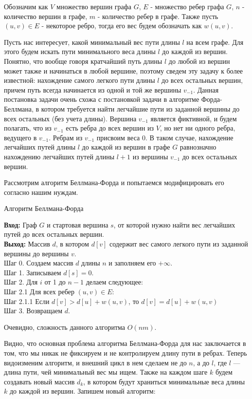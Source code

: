 \documentclass[a4paper,12pt]{report}
\theoremstyle{plain} %
\theoremstyle{definition}
\theoremstyle{remark}
\begin{document}
\begin{large}
Обозначим как $V$ множество вершин графа $G$, $E$ - множество ребер графа $G$, $n$ - количество вершин в графе, $m$ - количество ребер в графе. Также пусть $(u, v) \in E$ - некоторое ребро, тогда его вес будем обозначать как $w(u, v)$.

Пусть нас интересует, какой минимальный вес пути длины $l$ на всем графе. Для этого будем искать пути минимального веса длины $l$ до каждой из вершин. Понятно, что вообще говоря кратчайший путь длины $l$ до любой из вершин может также и начинаться в любой вершине, поэтому сведем эту задачу к более известной: нахождение самого легкого пути длины $l$ до всех остальных вершин, причем путь всегда начинается из одной и той же вершины $v_{-1}$. Данная постановка задачи очень схожа с постановкой задачи в алгоритме Форда-Беллмана, в котором требуется найти легчайшие пути из заданной вершины до всех остальных (без учета длины). Вершина $v_{-1}$ является фиктивной, и будем полагать, что из $v_{-1}$ есть ребра до всех вершин из $V$, но нет ни одного ребра, ведущего в $v_{-1}$. Ребрам из $v_{-1}$ присвоим веса 0. В таком случае, нахождение легчайших путей длины $l$ до каждой из вершин в графе $G$ равнозначно нахождению легчайших путей длины $l+1$ из вершины $v_{-1}$ до всех остальных вершин.

 Рассмотрим алгоритм Беллмана-Форда и попытаемся модифицировать его согласно нашим нуждам.

\begin{algorithm}[H]
\caption{Алгоритм Беллмана-Форда}
\label{diff_graph_construct}
\textbf{Вход:} Граф $G$ и стартовая вершина $s$, от которой нужно найти вес легчайших путей до всех остальных вершин.\\
\textbf{Выход:} Массив $d$, в котором $d[v]$ содержит вес самого легкого пути из заданной вершины до вершины $v$.\\
Шаг 0. Создаем массив $d$ длины $n$ и заполняем его $+\infty$. \\
Шаг 1. Записываем $d[s] = 0$.\\
Шаг 2. Для $i$ от 1 до $n-1$ делаем следующее:\\
Шаг 2.1 Для всех ребер $(u, v) \in E:$\\
Шаг 2.1.1 Если $d[v] > d[u] + w(u,v)$, то $d[v] = d[u] + w(u,v)$\\
Шаг 3. Возвращаем $d$.\\
\end{algorithm}

Очевидно, сложность данного алгоритма $O(nm)$.

Видно, что основная проблема алгоритма Беллмана-Форда для нас заключается в том, что мы никак не фиксируем и не контролируем длину пути в ребрах. Теперь видоизменим алгоритм, и внешний цикл в нем сделаем не до $n$, а до $l$, где $l$ --- длина пути, чей минимальный вес мы ищем. Также на каждом шаге $k$ будем создавать новый массив $d_k$, в котором будут храниться минимальные веса длины $k$ до каждой из вершин. Запишем новый алгоритм:


\end{large}
\end{document}
